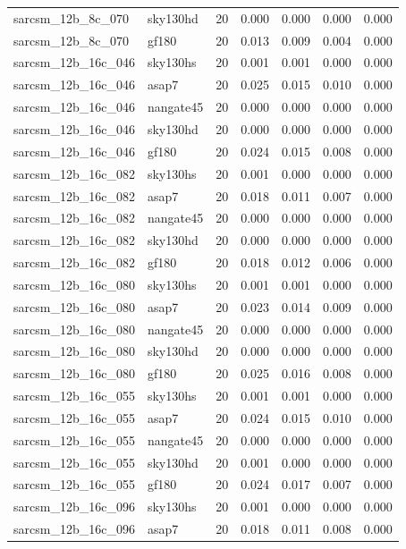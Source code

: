 \begin{tabular}{llrrrrr}
sarcsm\_12b\_8c\_070 & sky130hd & 20 & 0.000 & 0.000 & 0.000 & 0.000 \\
sarcsm\_12b\_8c\_070 & gf180 & 20 & 0.013 & 0.009 & 0.004 & 0.000 \\
sarcsm\_12b\_16c\_046 & sky130hs & 20 & 0.001 & 0.001 & 0.000 & 0.000 \\
sarcsm\_12b\_16c\_046 & asap7 & 20 & 0.025 & 0.015 & 0.010 & 0.000 \\
sarcsm\_12b\_16c\_046 & nangate45 & 20 & 0.000 & 0.000 & 0.000 & 0.000 \\
sarcsm\_12b\_16c\_046 & sky130hd & 20 & 0.000 & 0.000 & 0.000 & 0.000 \\
sarcsm\_12b\_16c\_046 & gf180 & 20 & 0.024 & 0.015 & 0.008 & 0.000 \\
sarcsm\_12b\_16c\_082 & sky130hs & 20 & 0.001 & 0.000 & 0.000 & 0.000 \\
sarcsm\_12b\_16c\_082 & asap7 & 20 & 0.018 & 0.011 & 0.007 & 0.000 \\
sarcsm\_12b\_16c\_082 & nangate45 & 20 & 0.000 & 0.000 & 0.000 & 0.000 \\
sarcsm\_12b\_16c\_082 & sky130hd & 20 & 0.000 & 0.000 & 0.000 & 0.000 \\
sarcsm\_12b\_16c\_082 & gf180 & 20 & 0.018 & 0.012 & 0.006 & 0.000 \\
sarcsm\_12b\_16c\_080 & sky130hs & 20 & 0.001 & 0.001 & 0.000 & 0.000 \\
sarcsm\_12b\_16c\_080 & asap7 & 20 & 0.023 & 0.014 & 0.009 & 0.000 \\
sarcsm\_12b\_16c\_080 & nangate45 & 20 & 0.000 & 0.000 & 0.000 & 0.000 \\
sarcsm\_12b\_16c\_080 & sky130hd & 20 & 0.000 & 0.000 & 0.000 & 0.000 \\
sarcsm\_12b\_16c\_080 & gf180 & 20 & 0.025 & 0.016 & 0.008 & 0.000 \\
sarcsm\_12b\_16c\_055 & sky130hs & 20 & 0.001 & 0.001 & 0.000 & 0.000 \\
sarcsm\_12b\_16c\_055 & asap7 & 20 & 0.024 & 0.015 & 0.010 & 0.000 \\
sarcsm\_12b\_16c\_055 & nangate45 & 20 & 0.000 & 0.000 & 0.000 & 0.000 \\
sarcsm\_12b\_16c\_055 & sky130hd & 20 & 0.001 & 0.000 & 0.000 & 0.000 \\
sarcsm\_12b\_16c\_055 & gf180 & 20 & 0.024 & 0.017 & 0.007 & 0.000 \\
sarcsm\_12b\_16c\_096 & sky130hs & 20 & 0.001 & 0.000 & 0.000 & 0.000 \\
sarcsm\_12b\_16c\_096 & asap7 & 20 & 0.018 & 0.011 & 0.008 & 0.000 \\

\end{tabular}
